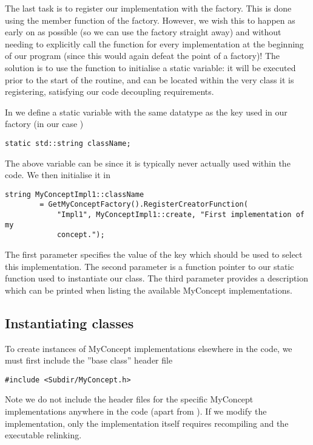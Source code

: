 The last task is to register our implementation with the factory. This is done 
using the  member function of the factory.
However, we wish this to happen as early on as possible (so we can use the 
factory straight away) and without needing to explicitly call the function for 
every implementation at the beginning of our program (since this would again 
defeat the point of a factory)! The solution is to use the function to 
initialise a static variable: it will be executed prior to the start of the
 routine, and can be located within the very class it is
registering, satisfying our code decoupling requirements.

In  we define a static variable with the same datatype
as the key used in our factory (in our case ) 
\begin{lstlisting}[style=C++Style]
static std::string className;
\end{lstlisting}
The above variable can be  since it is typically never actually
used within the code. We then initialise it in 

\begin{lstlisting}[style=C++Style] 
string MyConceptImpl1::className
        = GetMyConceptFactory().RegisterCreatorFunction(
            "Impl1", MyConceptImpl1::create, "First implementation of my
            concept.");
\end{lstlisting}
The first parameter specifies the value of the key which should be used to
select this implementation. The second parameter is a function pointer to our
static function used to instantiate our class. The third parameter provides a
description which can be printed when listing the available MyConcept
implementations.

\subsection{Instantiating classes}
To create instances of MyConcept implementations elsewhere in the code, we must
first include the ''base class'' header file
\begin{lstlisting}[style=C++Style]
#include <Subdir/MyConcept.h>
\end{lstlisting}
Note we do not include the header files for the specific MyConcept 
implementations anywhere in the code (apart from ).
If we modify the implementation, only the implementation itself requires 
recompiling and the executable relinking.

